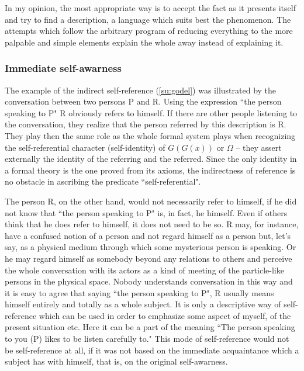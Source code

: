 In my opinion, the most appropriate way is to accept the fact as it presents itself and
try to find a description, 
a language which suits best the phenomenon. The attempts which 
follow the arbitrary program of reducing everything to the more palpable and simple 
elements explain the whole 
away instead of explaining it.

\subsubsection{Immediate self-awarness}
The example of the indirect self-reference (\ref{su:godel}) was illustrated by the 
conversation between two persons P and R. Using the 
expression ``the person speaking to P" R obviously refers to himself. If there are other people listening to the 
conversation, they realize  that the person referred by this description is R. They play then the same role as the 
whole formal system plays when recognizing the self-referential character (self-identity) of $G(G(x))$ or $\Omega$ -- they 
assert externally the identity of the referring and the referred. Since the only identity in a formal theory is the one 
proved from its axioms, the indirectness of reference is no obstacle in ascribing the predicate ``self-referential".

The person R, on the other hand, would not necessarily refer to himself, if he did not know that ``the person 
speaking to P" is, in fact, he himself. Even if others think that he does refer to himself, it does not need to be so. 
R may, for instance, have a confused notion of a person and not regard himself as a person but, let's say, as a 
physical medium through which some mysterious person is speaking. Or he may regard himself as somebody 
beyond any relations to others and perceive the whole conversation with its actors as a kind of meeting of the 
particle-like persons in the physical space. Nobody understands conversation in this way and it is easy to agree that 
saying ``the person speaking to P", R usually means himself entirely and totally as a whole subject. It is only a 
descriptive way of self-reference which can be used in order to emphasize some aspect of myself, of the 
present situation etc. Here it can be a part of the meaning ``The person speaking to you (P) likes to be listen 
carefully to." This mode of self-reference would not be self-reference at all, if it was not based on the immediate 
acquaintance which a subject has with himself, that is, on the original self-awarness.


